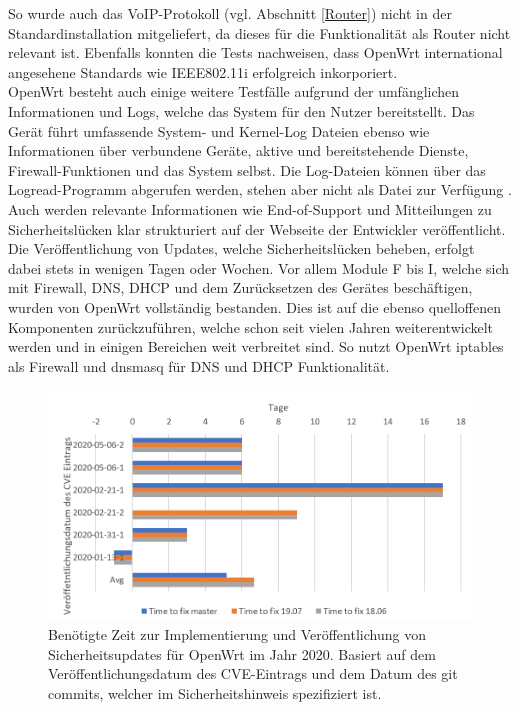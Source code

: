 \documentclass[a4paper]{book}
\begin{document}
\begin{large}
\begin{onehalfspace}
So wurde auch das VoIP-Protokoll (vgl. Abschnitt \ref{Router}) nicht in der Standardinstallation mitgeliefert, da dieses für die Funktionalität als Router nicht relevant ist. Ebenfalls konnten die Tests nachweisen, dass OpenWrt international angesehene Standards wie IEEE802.11i erfolgreich inkorporiert. 	\\ \indent
 	OpenWrt besteht auch einige weitere Testfälle aufgrund der umfänglichen Informationen und Logs, welche das System für den Nutzer bereitstellt. Das Gerät führt umfassende System- und Kernel-Log Dateien ebenso wie Informationen über verbundene Geräte, aktive und bereitstehende Dienste, Firewall-Funktionen und das System selbst. Die Log-Dateien können über das \glqq Logread\grqq -Programm abgerufen werden, stehen aber nicht als Datei zur Verfügung \cite{OpenWrtWebsiteLogread}. Auch werden relevante Informationen wie End-of-Support und Mitteilungen zu Sicherheitslücken klar strukturiert auf der Webseite der Entwickler veröffentlicht. Die Veröffentlichung von Updates, welche Sicherheitslücken beheben, erfolgt dabei stets in wenigen Tagen oder Wochen. Vor allem Module F bis I, welche sich mit Firewall, DNS, DHCP und dem Zurücksetzen des Gerätes beschäftigen, wurden von OpenWrt vollständig bestanden. Dies ist auf die ebenso quelloffenen Komponenten zurückzuführen, welche schon \vfill \pagebreak \noindent seit vielen Jahren weiterentwickelt werden und in einigen Bereichen weit verbreitet sind. So nutzt OpenWrt iptables als Firewall und dnsmasq für DNS und DHCP Funktionalität. \\ 


\begin{figure}[ht]
\begin{center}
\includegraphics[scale=0.6]{images/days_to_fix_cve} 
\caption{Benötigte Zeit zur Implementierung und Veröffentlichung von Sicherheitsupdates für OpenWrt im Jahr 2020. Basiert auf dem Veröffentlichungsdatum des CVE-Eintrags und dem Datum des git commits, welcher im Sicherheitshinweis spezifiziert ist.}
\label{fig:Time to fix CVE}
\end{center}
\end{figure}	



\end{onehalfspace}
\end{large}
\end{document}
